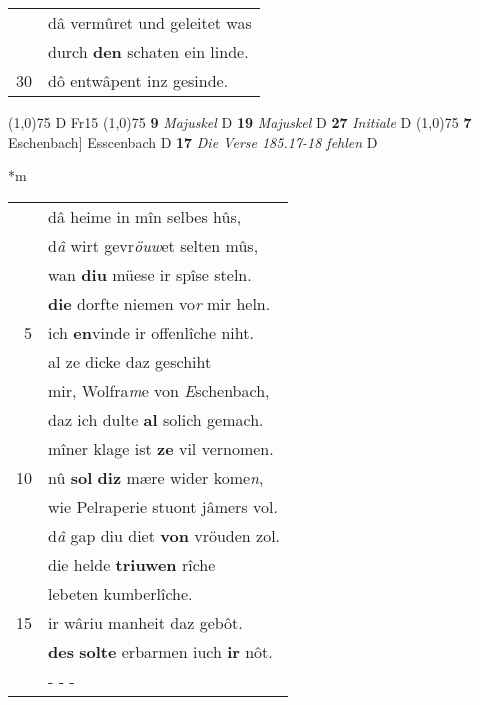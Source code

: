 \documentclass[8pt,a4paper,notitlepage]{article}
\begin{document}
\begin{table}[ht]
\begin{minipage}[t]{0.5\linewidth}
\begin{tabular}{rl}
 & dâ vermûret und geleitet was\\ 
 & durch \textbf{den} schaten ein linde.\\ 
30 & dô entwâpent inz gesinde.\\ 
\end{tabular}
\scriptsize
\line(1,0){75} \newline
D Fr15 \newline
\line(1,0){75} \newline
\textbf{9} \textit{Majuskel} D  \textbf{19} \textit{Majuskel} D  \textbf{27} \textit{Initiale} D  \newline
\line(1,0){75} \newline
\textbf{7} Eschenbach] Esscenbach D \textbf{17} \textit{Die Verse 185.17-18 fehlen} D  \newline
\end{minipage}
\hspace{0.5cm}
\begin{minipage}[t]{0.5\linewidth}
\small
\begin{center}*m
\end{center}
\begin{tabular}{rl}
 & dâ heime in mîn selbes hûs,\\ 
 & d\textit{â} wirt gevr\textit{öuw}et  selten mûs,\\ 
 & wan \textbf{diu} müese ir spîse steln.\\ 
 & \textbf{die} dorfte niemen vo\textit{r} mir heln.\\ 
5 & ich \textbf{en}vinde ir offenlîche niht.\\ 
 & al ze dicke daz geschiht\\ 
 & mir, Wolfra\textit{m}e von \textit{E}schenbach,\\ 
 & daz ich dulte \textbf{al} solich gemach.\\ 
 & mîner klage ist \textbf{ze} vil vernomen.\\ 
10 & nû \textbf{sol} \textbf{diz} mære wider kome\textit{n},\\ 
 & wie Pelraperie stuont jâmers vol.\\ 
 & d\textit{â} gap diu diet \textbf{von} vröuden zol.\\ 
 & die helde \textbf{triuwen} rîche\\ 
 & lebeten kumberlîche.\\ 
15 & ir wâriu manheit daz gebôt.\\ 
 & \textbf{des} \textbf{solte} erbarmen iuch \textbf{ir} nôt.\\ 
 & \multicolumn{1}{l}{ - - - }\\ 

\end{tabular}
\end{minipage}
\end{table}
\end{document}
